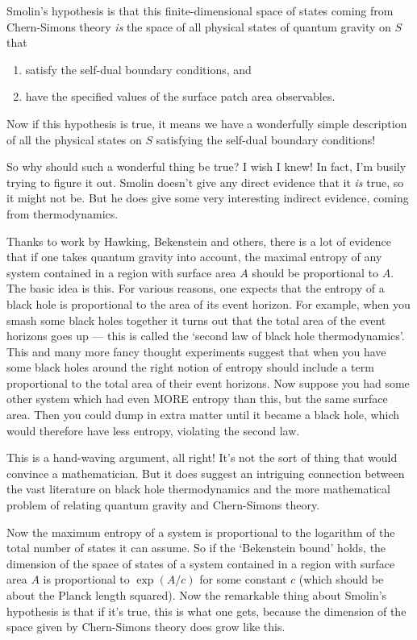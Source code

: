 \documentclass{article}
\def\tightlist{}
\begin{document}
Smolin's hypothesis is that this finite-dimensional space of states
coming from Chern-Simons theory \emph{is} the space of all physical
states of quantum gravity on \(S\) that

\begin{enumerate}
\def\labelenumi{\arabic{enumi})}
\tightlist
\item
  satisfy the self-dual boundary conditions, and
\item
  have the specified values of the surface patch area observables.
\end{enumerate}

Now if this hypothesis is true, it means we have a wonderfully simple
description of all the physical states on \(S\) satisfying the self-dual
boundary conditions!

So why should such a wonderful thing be true? I wish I knew! In fact,
I'm busily trying to figure it out. Smolin doesn't give any direct
evidence that it \emph{is} true, so it might not be. But he does give
some very interesting indirect evidence, coming from thermodynamics.

Thanks to work by Hawking, Bekenstein and others, there is a lot of
evidence that if one takes quantum gravity into account, the maximal
entropy of any system contained in a region with surface area \(A\)
should be proportional to \(A\). The basic idea is this. For various
reasons, one expects that the entropy of a black hole is proportional to
the area of its event horizon. For example, when you smash some black
holes together it turns out that the total area of the event horizons
goes up --- this is called the `second law of black hole
thermodynamics'. This and many more fancy thought experiments suggest
that when you have some black holes around the right notion of entropy
should include a term proportional to the total area of their event
horizons. Now suppose you had some other system which had even MORE
entropy than this, but the same surface area. Then you could dump in
extra matter until it became a black hole, which would therefore have
less entropy, violating the second law.

This is a hand-waving argument, all right! It's not the sort of thing
that would convince a mathematician. But it does suggest an intriguing
connection between the vast literature on black hole thermodynamics and
the more mathematical problem of relating quantum gravity and
Chern-Simons theory.

Now the maximum entropy of a system is proportional to the logarithm of
the total number of states it can assume. So if the `Bekenstein bound'
holds, the dimension of the space of states of a system contained in a
region with surface area \(A\) is proportional to \(\exp(A/c)\) for some
constant \(c\) (which should be about the Planck length squared). Now
the remarkable thing about Smolin's hypothesis is that if it's true,
this is what one gets, because the dimension of the space given by
Chern-Simons theory does grow like this.
\end{document}
